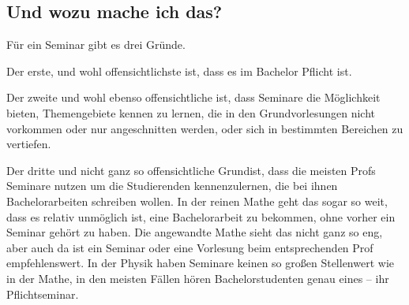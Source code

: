 \subsection{Und wozu mache ich das?}
Für ein Seminar gibt es drei Gründe.

Der erste, und wohl offensichtlichste ist, dass es im Bachelor Pflicht ist.

Der zweite und wohl ebenso offensichtliche ist, dass Seminare die Möglichkeit bieten, Themengebiete kennen zu lernen, die in den Grundvorlesungen nicht vorkommen oder nur angeschnitten werden, oder sich in bestimmten Bereichen zu vertiefen.

Der dritte und nicht ganz so offensichtliche Grundist, dass die meisten Profs Seminare nutzen um die Studierenden kennenzulernen, die bei ihnen Bachelorarbeiten schreiben wollen. In der reinen Mathe geht das sogar so weit, dass es relativ unmöglich ist, eine Bachelorarbeit zu bekommen, ohne vorher ein Seminar gehört zu haben. Die angewandte Mathe sieht das nicht ganz so eng, aber auch da ist ein Seminar oder eine Vorlesung beim entsprechenden Prof empfehlenswert. In der Physik haben Seminare keinen so großen Stellenwert wie in der Mathe, in den meisten Fällen hören Bachelorstudenten genau eines -- ihr Pflichtseminar.

